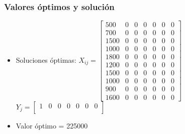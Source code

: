 \documentclass[a4paper,12pt]{article}
\begin{document}
\subsubsection{Valores óptimos y solución}
\begin{itemize}
	\item Soluciones óptimas: $X_{ij}=
	\begin{bmatrix}
	500 & 0 & 0 & 0 & 0 & 0 & 0\\
	700 & 0 & 0 & 0 & 0 & 0 & 0\\
	1500 & 0 & 0 & 0 & 0 & 0 & 0\\
	1000 & 0 & 0 & 0 & 0 & 0 & 0\\
	1800 & 0 & 0 & 0 & 0 & 0 & 0\\
	1200 & 0 & 0 & 0 & 0 & 0 & 0\\
	1500 & 0 & 0 & 0 & 0 & 0 & 0\\
	1000 & 0 & 0 & 0 & 0 & 0 & 0\\
	900 & 0 & 0 & 0 & 0 & 0 & 0\\
	1600 & 0 & 0 & 0 & 0 & 0 & 0
	\end{bmatrix}$
	\\
	$Y_{j}=
	\begin{bmatrix}
	1 & 0 & 0 & 0 & 0 & 0 & 0\\
	\end{bmatrix}$
	\item Valor óptimo = 225000
\end{itemize}
\end{document}
